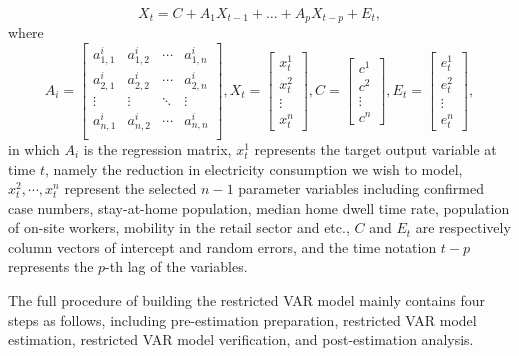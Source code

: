 \documentclass[10pt]{article}
\numberwithin{equation}{section}
\numberwithin{table}{section}
\numberwithin{figure}{section}
\begin{document}
\begin{equation}
  X_t=C+A_1X_{t-1}+\dots+A_pX_{t-p}+E_t,
\end{equation}
where
\begin{equation}
  A_i=
  \begin{bmatrix}
  a_{1,1}^i & a_{1,2}^i & \cdots & a_{1,n}^i\\
  a_{2,1}^i & a_{2,2}^i & \cdots & a_{2,n}^i\\
  \vdots & \vdots & \ddots & \vdots \\
  a_{n,1}^i & a_{n,2}^i & \cdots & a_{n,n}^i\\
  \end{bmatrix}
  ,X_t=
  \begin{bmatrix}
    x_t^1\\x_t^2\\\vdots\\x_t^n
  \end{bmatrix},
  C=
  \begin{bmatrix}
    c^1\\c^2\\\vdots\\c^n
  \end{bmatrix},
  E_t=
  \begin{bmatrix}
    e_t^1\\e_t^2\\\vdots\\e_t^n
  \end{bmatrix},
\end{equation}
in which $A_i$ is the regression matrix, $x_t^1$ represents the target output variable at time $t$, namely the reduction in electricity consumption we wish to model, $x_t^2,\cdots,x_t^n$ represent the selected $n-1$ parameter variables including confirmed case numbers, stay-at-home population, median home dwell time rate, population of on-site workers, mobility in the retail sector and etc., $C$ and $E_t$ are respectively column vectors of intercept and random errors, and the time notation $t-p$ represents the $p$-th lag of the variables.

The full procedure of building the restricted VAR model mainly contains four steps as follows, including pre-estimation preparation, restricted VAR model estimation, restricted VAR model verification, and post-estimation analysis.
\end{document}
